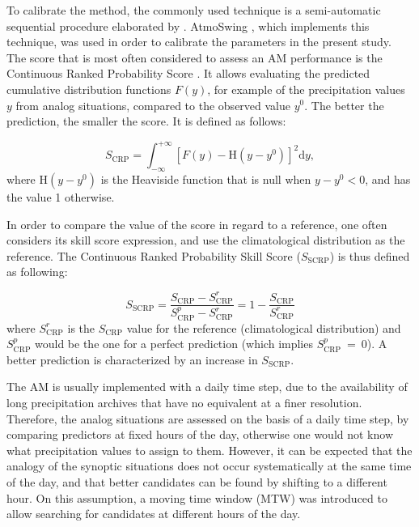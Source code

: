 \documentclass[hess, manuscript]{copernicus}
\begin{document}
To calibrate the method, the commonly used technique is a semi-automatic sequential procedure elaborated by \citet{Bontron2004}. AtmoSwing \citep{Horton2016}, which implements this technique, was used in order to calibrate the parameters in the present study. The score that is most often considered to assess an AM performance is the Continuous Ranked Probability Score \citep[$S_{\text{CRP}}$,][]{Brown1974, Matheson1976, Hersbach2000}. It allows evaluating the predicted cumulative distribution functions $F(y)$, for example of the precipitation values $y$ from analog situations, compared to the observed value $y^{0}$. The better the prediction, the smaller the score. It is defined as follows:

\begin{equation}
\label{eq:CRPS}
S_{\text{CRP}} = \int_{-\infty}^{+\infty} \left[ F(y)-\text{H}(y-y^{0})\right]^{2} \text{d}y ,  
\end{equation}
where $\text{H}(y-y^{0})$ is the Heaviside function that is null when $y-y^{0}<0$, and has the value 1 otherwise.

In order to compare the value of the score in regard to a reference, one often considers its skill score expression, and use the climatological distribution as the reference. The Continuous Ranked Probability Skill Score ($S_{\text{SCRP}}$) is thus defined as following:

\begin{equation}
\label{eq:CRPSS}
S_{\text{SCRP}} = \frac{S_{\text{CRP}}-S_{\text{CRP}}^{r}}{S_{\text{CRP}}^{p}-S_{\text{CRP}}^{r}} = 1-\frac{S_{\text{CRP}}}{S_{\text{CRP}}^{r}}
\end{equation}
where $S_{\text{CRP}}^{r}$ is the $S_{\text{CRP}}$ value for the reference (climatological distribution) and $S_{\text{CRP}}^{p}$ would be the one for a perfect prediction (which implies $S_{\text{CRP}}^{p}~=~0$). A better prediction is characterized by an increase in $S_{\text{SCRP}}$. 

The AM is usually implemented with a daily time step, due to the availability of long precipitation archives that have no equivalent at a finer resolution. Therefore, the analog situations are assessed on the basis of a daily time step, by comparing predictors at fixed hours of the day, otherwise one would not know what precipitation values to assign to them. However, it can be expected that the analogy of the synoptic situations does not occur systematically at the same time of the day, and that better candidates can be found by shifting to a different hour. On this assumption, a moving time window (MTW) was introduced to allow searching for candidates at different hours of the day.
\end{document}
